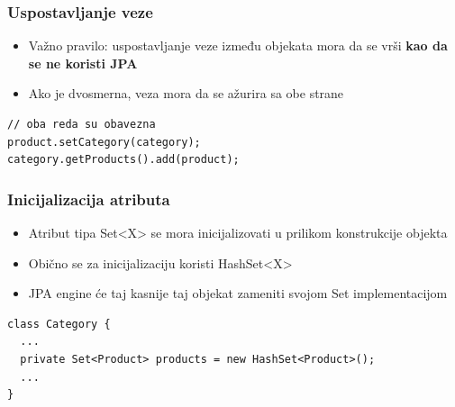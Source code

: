\documentclass[compress]{beamer}
\begin{document}
\begin{frame}[fragile]
  \frametitle{Uspostavljanje veze}
  \begin{itemize}
    \item Važno pravilo: uspostavljanje veze između objekata mora da se vrši {\bf kao da se ne koristi JPA}
    \item Ako je dvosmerna, veza mora da se ažurira sa obe strane
  \end{itemize}
\begin{verbatim}
// oba reda su obavezna
product.setCategory(category);
category.getProducts().add(product);
\end{verbatim}
\end{frame}
\begin{frame}[fragile]
  \frametitle{Inicijalizacija atributa}
  \begin{itemize}
    \item Atribut tipa Set<X> se mora inicijalizovati u prilikom konstrukcije objekta
    \item Obično se za inicijalizaciju koristi HashSet<X>
    \item JPA engine će taj kasnije taj objekat zameniti svojom Set implementacijom
  \end{itemize}
\begin{verbatim}
class Category {
  ...
  private Set<Product> products = new HashSet<Product>();
  ...
}
\end{verbatim}
\end{frame}
\end{document}
